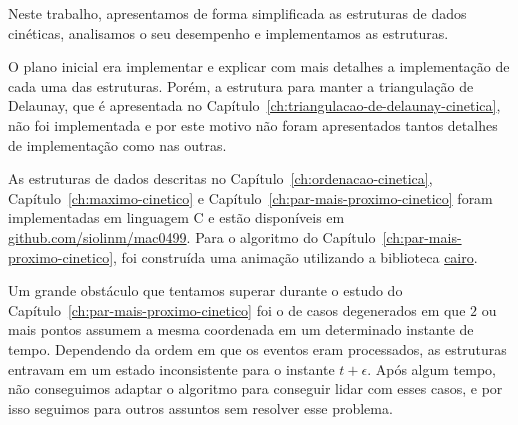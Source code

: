 
\label{cap:conclusao}

Neste trabalho, apresentamos de forma simplificada as estruturas de dados cinéticas, analisamos o seu desempenho e
implementamos as estruturas.

O plano inicial era implementar e explicar com mais detalhes a implementação de cada uma das estruturas.
Porém, a estrutura para manter a triangulação de Delaunay, que é apresentada no
Capítulo~\ref{ch:triangulacao-de-delaunay-cinetica}, não foi implementada e por este motivo não foram apresentados
tantos detalhes de implementação como nas outras.

As estruturas de dados descritas no Capítulo~\ref{ch:ordenacao-cinetica},
Capítulo~\ref{ch:maximo-cinetico} e Capítulo~\ref{ch:par-mais-proximo-cinetico} foram implementadas
em linguagem C e estão disponíveis em \href{https://github
.com/siolinm/mac0499/tree/main/implementacao}{github.com/siolinm/mac0499}.
Para o algoritmo do Capítulo~\ref{ch:par-mais-proximo-cinetico}, foi construída uma animação
utilizando a biblioteca \href{https://www.cairographics.org/}{cairo}.

Um grande obstáculo que tentamos superar durante o estudo do Capítulo~\ref{ch:par-mais-proximo-cinetico}
foi o de casos degenerados em que $2$ ou mais pontos assumem a mesma coordenada em um determinado instante de tempo.
Dependendo da ordem em que os eventos eram processados, as estruturas entravam em um estado inconsistente para
o instante $t + \epsilon$.
Após algum tempo, não conseguimos adaptar o algoritmo para conseguir lidar com esses casos, e por isso seguimos para
outros assuntos sem resolver esse problema.

